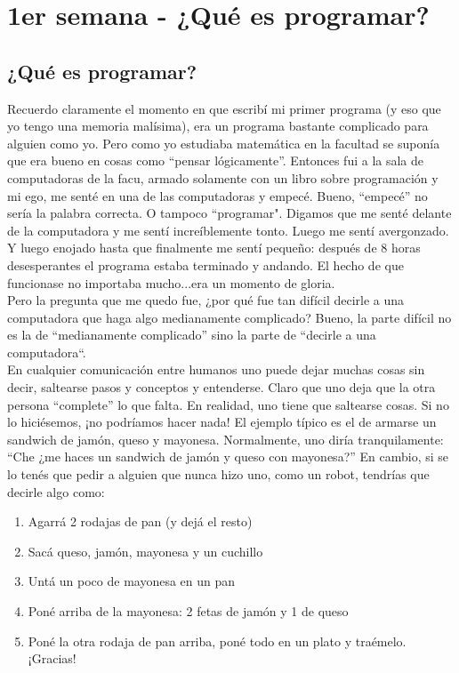 \chapter{1er semana - ¿Qué es programar?}
\section{¿Qué es programar?}
Recuerdo claramente el momento en que escribí mi primer programa (y eso que yo tengo una memoria malísima), era un programa bastante complicado para alguien como yo. Pero como yo estudiaba matemática en la facultad se suponía que era bueno en cosas como ``pensar lógicamente''. Entonces fui a la sala de computadoras de la facu, armado solamente con un libro sobre programación y mi ego, me senté en una de las computadoras y empecé. Bueno, ``empecé'' no sería la palabra correcta. O tampoco ``programar". Digamos que me senté delante de la computadora y me sentí increíblemente tonto. Luego me sentí avergonzado. Y luego enojado hasta que finalmente me sentí pequeño: después de 8 horas desesperantes el programa estaba terminado y andando. El hecho de que funcionase no importaba mucho...era un momento de gloria.\\

Pero la pregunta que me quedo fue, ¿por qué fue tan difícil decirle a una computadora que haga algo medianamente complicado? Bueno, la parte difícil no es la de ``medianamente complicado'' sino la parte de ``decirle a una computadora``.\\

En cualquier comunicación entre humanos uno puede dejar muchas cosas sin decir, saltearse pasos y conceptos y entenderse. Claro que uno deja que la otra persona ``complete'' lo que falta. En realidad, uno tiene que saltearse cosas. Si no lo hiciésemos, ¡no podríamos hacer nada! El ejemplo típico es el  de armarse un sandwich de jamón, queso y mayonesa. Normalmente, uno diría tranquilamente: ``Che ¿me haces un sandwich de jamón y queso con mayonesa?'' En cambio, si se lo tenés que pedir a alguien que nunca hizo uno, como un robot, tendrías que decirle algo como:
\begin{enumerate}
  \item Agarrá 2 rodajas de pan (y dejá el resto)
  \item Sacá queso, jamón, mayonesa y un cuchillo
  \item Untá un poco de mayonesa en un pan
  \item Poné arriba de la mayonesa: 2 fetas de jamón y 1 de queso
  \item Poné la otra rodaja de pan arriba, poné todo en un plato y traémelo. ¡Gracias!
\end{enumerate}


